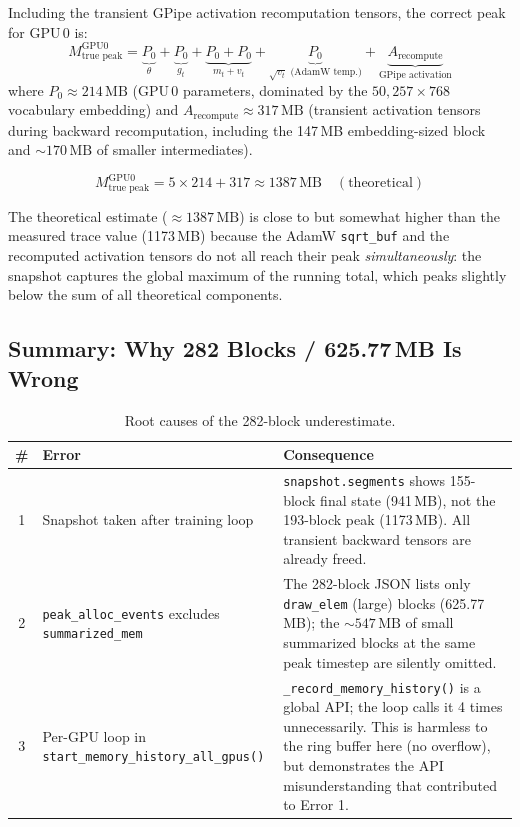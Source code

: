 \documentclass[11pt,a4paper]{article}
\begin{document}
Including the transient GPipe activation recomputation tensors, the correct
peak for GPU\,0 is:
\begin{equation}
  M_{\text{true peak}}^{\text{GPU0}}
  = \underbrace{P_0}_{\theta}
  + \underbrace{P_0}_{g_t}
  + \underbrace{P_0 + P_0}_{m_t + v_t}
  + \underbrace{P_0}_{\sqrt{v_t}\text{ (AdamW temp.)}}
  + \underbrace{A_{\text{recompute}}}_{\text{GPipe activation}}
  \label{eq:truepeak_formula}
\end{equation}
where $P_0 \approx 214\,\text{MB}$ (GPU\,0 parameters, dominated by the
$50{,}257 \times 768$ vocabulary embedding) and
$A_{\text{recompute}} \approx 317\,\text{MB}$ (transient activation tensors
during backward recomputation, including the 147\,MB embedding-sized block
and $\sim 170\,\text{MB}$ of smaller intermediates).

\begin{equation}
\boxed{
  M_{\text{true peak}}^{\text{GPU0}}
  = 5 \times 214 + 317
  \approx 1387\,\text{MB}
  \quad (\text{theoretical})
}
\end{equation}

\noindent The theoretical estimate ($\approx 1387\,\text{MB}$) is close to
but somewhat higher than the measured trace value (1173\,MB) because the
AdamW \texttt{sqrt\_buf} and the recomputed activation tensors do not all
reach their peak \emph{simultaneously}: the snapshot captures the global
maximum of the running total, which peaks slightly below the sum of all
theoretical components.

\subsection{Summary: Why 282 Blocks / 625.77\,MB Is Wrong}
\label{sec:wrongsummary}

\begin{table}[h]
\centering
\caption{Root causes of the 282-block underestimate.}
\label{tab:errors}
\begin{tabular}{clp{8cm}}
\toprule
\textbf{\#} & \textbf{Error} & \textbf{Consequence} \\
\midrule
1 & Snapshot taken after training loop
  & \texttt{snapshot.segments} shows 155-block final state (941\,MB),
    not the 193-block peak (1173\,MB).  All transient backward tensors
    are already freed. \\[4pt]
2 & \texttt{peak\_alloc\_events} excludes \texttt{summarized\_mem}
  & The 282-block JSON lists only \texttt{draw\_elem} (large) blocks
    (625.77\,MB); the $\sim 547\,\text{MB}$ of small summarized blocks
    at the same peak timestep are silently omitted. \\[4pt]
3 & Per-GPU loop in \texttt{start\_memory\_history\_all\_gpus()}
  & \texttt{\_record\_memory\_history()} is a global API; the loop
    calls it 4 times unnecessarily.  This is harmless to the ring buffer
    here (no overflow), but demonstrates the API misunderstanding that
    contributed to Error 1. \\
\bottomrule
\end{tabular}
\end{table}
\end{document}
